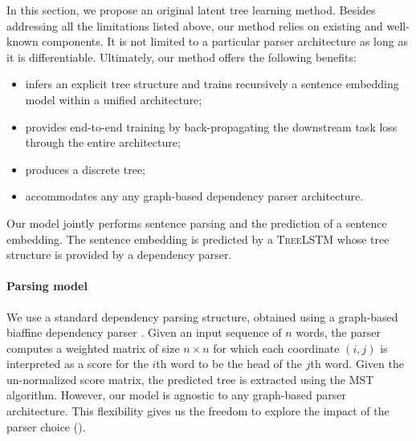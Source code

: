 In this section, we propose an original latent tree learning method. Besides addressing all the limitations listed above, our method relies on existing and well-known components. It is not limited to a particular parser architecture as long as it is differentiable. Ultimately, our method offers the following benefits:
\begin{itemize}
    \item infers an explicit tree structure and trains recursively a sentence embedding model within a unified architecture;
    \item provides end-to-end training by back-propagating the downstream task loss through the entire architecture;
    \item produces a discrete tree;
    \item accommodates any any graph-based dependency parser architecture.
\end{itemize}





Our model jointly performs sentence parsing and the prediction of a sentence embedding. The sentence embedding is predicted by a \textsc{TreeLSTM} whose tree structure is provided by a dependency parser.

\paragraph{Parsing model} We use a standard dependency parsing structure, obtained using a graph-based biaffine dependency parser \parencite{dozat_17}. Given an input sequence of $n$ words, the parser computes a weighted matrix of size $n \times n$ for which each coordinate $(i, j)$ is interpreted as a score for the $i$th word to be the head of the $j$th word. Given the un-normalized score matrix, the predicted tree is extracted using the MST algorithm. However, our model is agnostic to any graph-based parser architecture. This flexibility gives us the freedom to explore the impact of the parser choice ().

